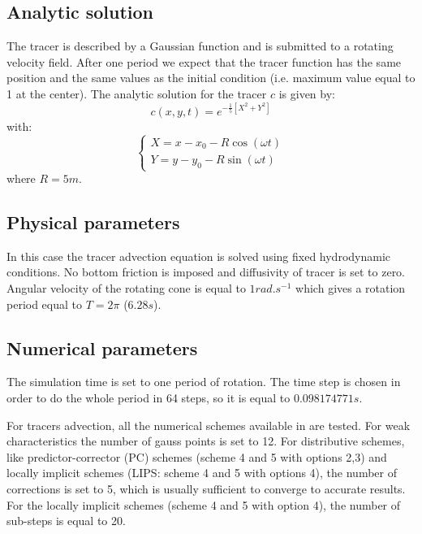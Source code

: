\subsection{Analytic solution}

The tracer is described by a Gaussian function and is submitted to a rotating velocity field. 
After one period we expect that the tracer function has the same position and the same values as the initial condition (i.e. maximum value equal to 1 at the center). 
The analytic solution for the tracer $c$ is given by:
\begin{equation*}
c(x,y,t)=e^{-\frac{1}{5}[X^2+Y^2]}
\end{equation*}
with: 
\begin{equation*}
\left\{
    \begin{array}{ll}
        X = x - x_0 - R \cos(\omega t) \\
        Y = y - y_0 - R \sin(\omega t)
    \end{array}
\right.
\end{equation*}
where $R=5m$.

\subsection{Physical parameters}

In this case the tracer advection equation is solved using fixed hydrodynamic conditions.
No bottom friction is imposed and diffusivity of tracer is set to zero.
Angular velocity of the rotating cone is equal to $1 rad.s^{-1}$ which gives a rotation period equal to $T=2\pi$ ($6.28s$). 

\subsection{Numerical parameters}

The simulation time is set to one period of rotation.
The time step is chosen in order to do the whole period in 64 steps, so it is equal to $0.098174771s$.

For tracers advection, all the numerical schemes available in  are tested. 
For weak characteristics the number of gauss points is set to 12. For distributive schemes, like predictor-corrector (PC) schemes (scheme 4 and 5 with options 2,3) and locally implicit schemes (LIPS: scheme 4 and 5 with options 4), the number of corrections is set to 5, which is usually sufficient to converge to accurate results. For the locally implicit schemes (scheme 4 and 5 with option 4), the number of sub-steps is equal to 20.

